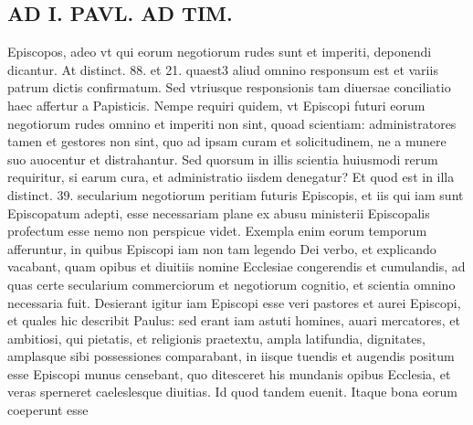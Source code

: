 \documentclass{article}
\begin{document}
\begin{pages}
\section*{AD I. PAVL. AD TIM. }
\marginpar{[ p.152 ]}\pstart Episcopos, adeo vt qui eorum negotiorum rudes sunt et imperiti, deponendi dicantur. At distinct. 88. et 21. quaest3 aliud omnino responsum est et variis patrum dictis confirmatum. Sed vtriusque responsionis tam diuersae conciliatio haec affertur a Papisticis. Nempe requiri quidem, vt Episcopi futuri eorum negotiorum rudes omnino et imperiti non sint, quoad scientiam: administratores tamen et gestores non sint, quo ad ipsam curam et solicitudinem, ne a munere suo auocentur et distrahantur. Sed quorsum in illis scientia huiusmodi rerum requiritur, si earum cura, et administratio iisdem denegatur? Et quod est in illa distinct. 39. secularium negotiorum peritiam futuris Episcopis, et iis qui iam sunt Episcopatum adepti, esse necessariam plane ex abusu ministerii Episcopalis profectum esse nemo non perspicue videt. Exempla enim eorum temporum afferuntur, in quibus Episcopi iam non tam legendo Dei verbo, et explicando vacabant, quam opibus et diuitiis nomine Ecclesiae congerendis et cumulandis, ad quas certe secularium commerciorum et negotiorum cognitio, et scientia omnino necessaria fuit. Desierant igitur iam Episcopi esse veri pastores et aurei Episcopi, et quales hic describit Paulus: sed erant iam astuti homines, auari mercatores, et ambitiosi, qui pietatis, et religionis praetextu, ampla latifundia, dignitates, amplasque  sibi possessiones comparabant, in iisque tuendis et augendis positum esse Episcopi munus censebant, quo ditesceret his mundanis opibus Ecclesia, et veras sperneret caeleslesque  diuitias. Id quod tandem euenit. Itaque bona eorum coeperunt esse  \pend

\end{pages}
\end{document}
